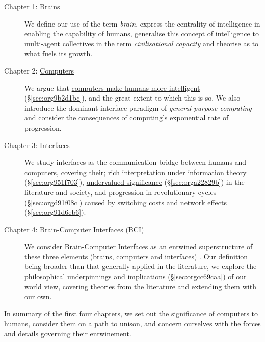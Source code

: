 \documentclass[logo,bsc,singlespacing,parskip]{infthesis}
\begin{document}
\begin{description}
\item[{Chapter 1: \hyperref[sec:orgb6f64cb]{Brains}}] We define our use of the term \emph{brain}, express the centrality of intelligence in enabling the capability of humans, generalise this concept of intelligence to multi-agent collectives in the term \emph{civilisational capacity} and theorise as to what fuels its growth.

\item[{Chapter 2: \hyperref[sec:org0753a80]{Computers}}] We argue that \hyperref[sec:org9b2d1bc]{computers make humans more intelligent} (\S \ref{sec:org9b2d1bc}), and the great extent to which this is so.
We also introduce the dominant interface paradigm of \emph{general purpose computing} and consider the consequences of computing's exponential rate of progression.

\item[{Chapter 3: \hyperref[sec:org17f0df0]{Interfaces}}] We study interfaces as the communication bridge between humans and computers, covering their;  \hyperref[sec:org951f703]{rich interpretation under information theory} (\S \ref{sec:org951f703}), \hyperref[sec:orga22829b]{undervalued significance} (\S \ref{sec:orga22829b}) in the literature and society, and progression in \hyperref[sec:orgd91f08c]{revolutionary cycles} (\S \ref{sec:orgd91f08c}) caused by \hyperref[sec:org91d6eb6]{switching costs and network effects} (\S \ref{sec:org91d6eb6}).

\item[{Chapter 4: \hyperref[sec:org56fce65]{Brain-Computer Interfaces (BCI)}}] We consider Brain-Computer Interfaces as an entwined superstructure of these three elements (brains, computers and interfaces) . Our definition being broader than that generally applied in the literature, we explore the \hyperref[sec:orgcc69caa]{philosophical underpinnings and implications} (\S \ref{sec:orgcc69caa}) of our world view, covering theories from the literature and extending them with our own.
\end{description}

In summary of the first four chapters, we set out the significance of computers to humans, consider them on a path to unison, and concern ourselves with the forces and details governing their entwinement.
\end{document}
